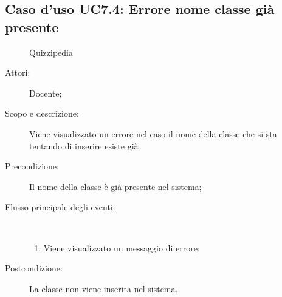 \subsection{Caso d'uso UC7.4: Errore nome classe già presente}
	\begin{figure}[H]
		\centering
		\begin{resizedtikzpicture}{\textwidth}
		\begin{umlsystem}[x=0, fill=lightgray!20]{Quizzipedia}
		\end{umlsystem}
		\end{resizedtikzpicture}
		\caption{}
	\end{figure}
\begin{description}
\item[Attori:] Docente;
\item[Scopo e descrizione:] Viene visualizzato un errore nel caso il nome della classe che si sta tentando di inserire esiste già
      \item[Precondizione:] Il nome della classe è già presente nel sistema;

        \item[Flusso principale degli eventi:] \ 
 \begin{enumerate}
          \item Viene visualizzato un messaggio di errore;

      \end{enumerate}
    \item[Postcondizione:] La classe non viene inserita nel sistema.
  \end{description}
\hypertarget{UC8}{}
